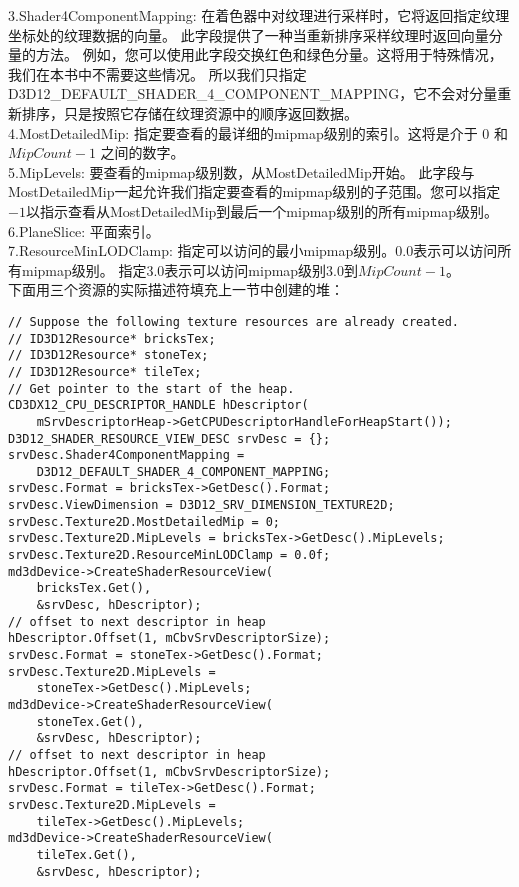 \begin{flushleft}
3.Shader4ComponentMapping: 在着色器中对纹理进行采样时，它将返回指定纹理坐标处的纹理数据的向量。 此字段提供了一种当重新排序采样纹理时返回向量分量的方法。 例如，您可以使用此字段交换红色和绿色分量。这将用于特殊情况，我们在本书中不需要这些情况。 所以我们只指定 D3D12\_DEFAULT\_SHADER\_4\_COMPONENT\_MAPPING，它不会对分量重新排序，只是按照它存储在纹理资源中的顺序返回数据。\\

4.MostDetailedMip: 指定要查看的最详细的mipmap级别的索引。这将是介于 $0$ 和 $MipCount-1$ 之间的数字。\\

5.MipLevels: 要查看的mipmap级别数，从MostDetailedMip开始。 此字段与MostDetailedMip一起允许我们指定要查看的mipmap级别的子范围。您可以指定$-1$以指示查看从MostDetailedMip到最后一个mipmap级别的所有mipmap级别。\\

6.PlaneSlice: 平面索引。\\

7.ResourceMinLODClamp: 指定可以访问的最小mipmap级别。0.0表示可以访问所有mipmap级别。 指定3.0表示可以访问mipmap级别3.0到$MipCount-1$。\\

下面用三个资源的实际描述符填充上一节中创建的堆：\\
\end{flushleft}

\begin{lstlisting}
// Suppose the following texture resources are already created.
// ID3D12Resource* bricksTex;
// ID3D12Resource* stoneTex;
// ID3D12Resource* tileTex;
// Get pointer to the start of the heap.
CD3DX12_CPU_DESCRIPTOR_HANDLE hDescriptor(
    mSrvDescriptorHeap->GetCPUDescriptorHandleForHeapStart());
D3D12_SHADER_RESOURCE_VIEW_DESC srvDesc = {};
srvDesc.Shader4ComponentMapping = 
    D3D12_DEFAULT_SHADER_4_COMPONENT_MAPPING;
srvDesc.Format = bricksTex->GetDesc().Format;
srvDesc.ViewDimension = D3D12_SRV_DIMENSION_TEXTURE2D;
srvDesc.Texture2D.MostDetailedMip = 0;
srvDesc.Texture2D.MipLevels = bricksTex->GetDesc().MipLevels;
srvDesc.Texture2D.ResourceMinLODClamp = 0.0f;
md3dDevice->CreateShaderResourceView(
    bricksTex.Get(),
    &srvDesc, hDescriptor);
// offset to next descriptor in heap
hDescriptor.Offset(1, mCbvSrvDescriptorSize);
srvDesc.Format = stoneTex->GetDesc().Format;
srvDesc.Texture2D.MipLevels = 
    stoneTex->GetDesc().MipLevels;
md3dDevice->CreateShaderResourceView(
    stoneTex.Get(),
    &srvDesc, hDescriptor);
// offset to next descriptor in heap
hDescriptor.Offset(1, mCbvSrvDescriptorSize);
srvDesc.Format = tileTex->GetDesc().Format;
srvDesc.Texture2D.MipLevels = 
    tileTex->GetDesc().MipLevels;
md3dDevice->CreateShaderResourceView(
    tileTex.Get(),
    &srvDesc, hDescriptor);
\end{lstlisting}


